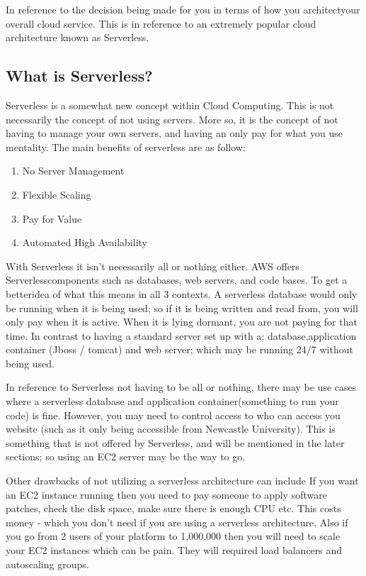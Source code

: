 \documentclass[runningheads]{llncs}
\begin{document}
In reference to the decision being made for you in terms of how you architectyour overall cloud service. This is in reference to an extremely popular cloud architecture known as Serverless.

\subsection{What is Serverless?}
Serverless is a somewhat new concept within Cloud Computing. This is not necessarily the concept of not using servers. More so, it is the concept of not having to manage your own servers, and having an only pay for what you use mentality. The main benefits of serverless are as follow:
\begin{enumerate}
	\item No Server Management
	\item Flexible Scaling
	\item Pay for Value
	\item Automated High Availability
\end{enumerate}

With Serverless it isn't necessarily all or nothing either. AWS offers Serverlesscomponents such as databases, web servers, and code bases. To get a betteridea of what this means in all 3 contexts. A serverless database would only be running when it is being used; so if it is being written and read from, you will only pay when it is active. When it is lying dormant, you are not paying for that time. In contrast to having a standard server set up with a; database,application container (Jboss / tomcat) and web server; which may be running 24/7 without being used.

In reference to Serverless not having to be all or nothing, there may be use cases where a serverless database and application container(something to run your code) is fine. However, you may need to control access to who can access you website (such as it only being accessible from Newcastle University). This is something that is not offered by Serverless, and will be mentioned in the later sections; so using an EC2 server may be the way to go.

Other drawbacks of not utilizing a serverless architecture can include If you want an EC2 instance running then you need to pay someone to apply software patches, check the disk space, make sure there is enough CPU  etc. This costs money - which you don't need if you are using a serverless architecture. Also if you go from 2 users of your platform to 1,000,000 then you will need to scale your EC2 instances which can be pain.  They will required load balancers and autoscaling groups.
\end{document}
